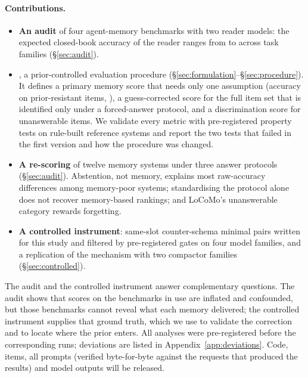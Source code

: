 \paragraph{Contributions.}
\begin{itemize}
\item \textbf{An audit} of four agent-memory benchmarks with two reader models: the expected closed-book accuracy of the
reader ranges from \gFcMhPct{} to \gEventqaPct{} across task families (\S\ref{sec:audit}).
\item \textbf{\pcme{}}, a prior-controlled evaluation procedure (\S\ref{sec:formulation}--\S\ref{sec:procedure}). It
defines a primary memory score that needs only one assumption (accuracy on prior-resistant items, \cpr{}), a
guess-corrected score for the full item set that is identified only under a forced-answer protocol, and a
discrimination score for unanswerable items. We validate every metric with pre-registered property tests on rule-built
reference systems and report the two tests that failed in the first version and how the procedure was changed.
\item \textbf{A re-scoring} of twelve memory systems under three answer protocols (\S\ref{sec:audit}). Abstention, not
memory, explains most raw-accuracy differences among memory-poor systems; standardising the protocol alone does not
recover memory-based rankings; and LoCoMo's unanswerable category rewards forgetting.
\item \textbf{A controlled instrument}: \nFinal{} same-slot counter-schema minimal pairs written for this study and
filtered by pre-registered gates on four model families, and a replication of the mechanism with two compactor
families (\S\ref{sec:controlled}).
\end{itemize}
The audit and the controlled instrument answer complementary questions. The audit shows that scores on the benchmarks in
use are inflated and confounded, but those benchmarks cannot reveal what each memory delivered; the controlled instrument
supplies that ground truth, which we use to validate the correction and to locate where the prior enters.
All analyses were pre-registered before the corresponding runs; deviations are listed in Appendix~\ref{app:deviations}.
Code, items, all prompts (verified byte-for-byte against the requests that produced the results) and model outputs
will be released.
